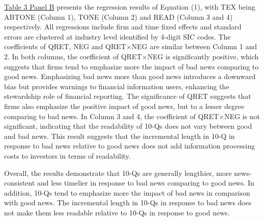 \documentclass[a4paper]{article}
\begin{document}
\begin{spacing}{2}
\hyperref[T3PB]{Table 3 Panel B} presents the regression results of Equation (1), with TEX being ABTONE (Column 1), TONE (Column 2) and READ (Column 3 and 4) respectively. All regressions include firm and time fixed effects and standard errors are clustered at industry level identified by 4-digit SIC codes. The coefficients of QRET, NEG and QRET$\times$NEG are similar between Column 1 and 2. In both columns, the coefficient of QRET$\times$NEG is significantly positive, which suggests that firms tend to emphasize more the impact of bad news comparing to good news. Emphasizing bad news more than good news introduces a downward bias but provides warnings to financial information users, enhancing the stewardship role of financial reporting. The significance of QRET suggests that firms also emphasize the positive impact of good news, but to a lesser degree comparing to bad news. In Column 3 and 4, the coefficient of QRET$\times$NEG is not significant, indicating that the readability of 10-Qs does not vary between good and bad news. This result suggests that the incremental length in 10-Q in response to bad news relative to good news does not add information processing costs to investors in terms of readability.

Overall, the results demonstrate that 10-Qs are generally lengthier, more news-consistent and less timelier in response to bad news comparing to good news. In addition, 10-Qs tend to emphasize more the impact of bad news in comparison with good news. The incremental length in 10-Qs in response to bad news does not make them less readable relative to 10-Qs in response to good news.


\end{spacing}
\end{document}
